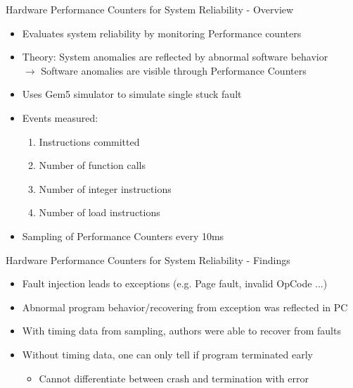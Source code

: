 \documentclass[aspectratio=169]{beamer}
\begin{document}
\begin{frame}{Hardware Performance Counters for System Reliability - Overview}
    \begin{itemize}
        \item Evaluates system reliability by monitoring Performance counters
        \item Theory: System anomalies are reflected by abnormal software behavior
              \\ $\rightarrow$ Software anomalies are visible through Performance Counters
        \item Uses Gem5 simulator to simulate single stuck fault
        \item Events measured:
              \begin{enumerate}
                  \item Instructions committed
                  \item Number of function calls
                  \item Number of integer instructions
                  \item Number of load instructions
              \end{enumerate}
        \item Sampling of Performance Counters every 10ms
    \end{itemize}
\end{frame}
\begin{frame}{Hardware Performance Counters for System Reliability - Findings}
    \begin{itemize}
        \item Fault injection leads to exceptions (e.g. Page fault, invalid OpCode ...)
        \item Abnormal program behavior/recovering from exception was reflected in PC
        \item With timing data from sampling, authors were able to recover from faults
        \item Without timing data, one can only tell if program terminated early
              \begin{itemize}
                  \item Cannot differentiate between crash and termination with error
              \end{itemize}
    \end{itemize}
\end{frame}
\end{document}
